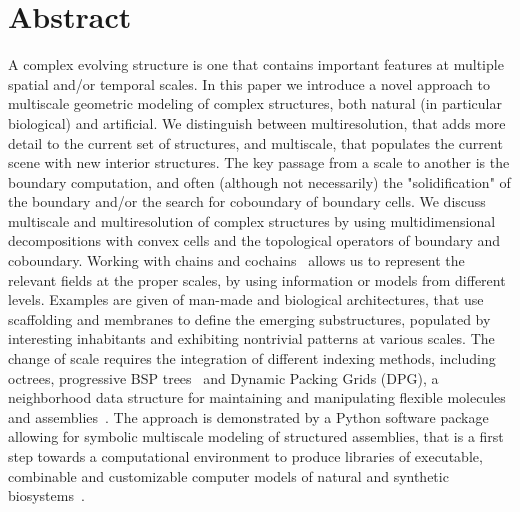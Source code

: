 \section*{Abstract}
A complex evolving structure is one that contains important features at multiple spatial and/or temporal scales. In this paper we introduce a novel approach to multiscale geometric modeling of complex structures, both natural (in particular biological) and artificial. We distinguish between multiresolution, that adds more detail to the current set of structures, and multiscale, that populates the current scene with new interior structures. The key passage from a scale to another is the boundary computation, and often (although not necessarily) the "solidification" of the boundary and/or the search for coboundary of boundary cells.  We discuss multiscale and multiresolution of complex structures by using multidimensional decompositions with convex cells and the topological operators of boundary and coboundary. Working with chains and cochains~\cite{DicarloMPS09} allows us to represent the relevant fields at the proper scales, by using information or models from different levels. Examples are given of man-made and biological architectures, that use scaffolding and membranes to define the emerging substructures, populated by interesting inhabitants and exhibiting nontrivial patterns at various scales. The change of scale requires the integration of different indexing methods, including octrees, progressive BSP trees~\cite{ScorzelliPP-PSM2008} and Dynamic Packing Grids (DPG), a neighborhood data structure for maintaining and manipulating flexible molecules and assemblies~\cite{Bajaj:2009:DDS:1629255.1629287}. The approach is demonstrated by a Python software package allowing for symbolic multiscale modeling of structured assemblies, that is a first step towards a computational environment to produce libraries of executable, combinable and customizable computer models of natural and synthetic biosystems~\cite{BajajDP-PPP2008}.

